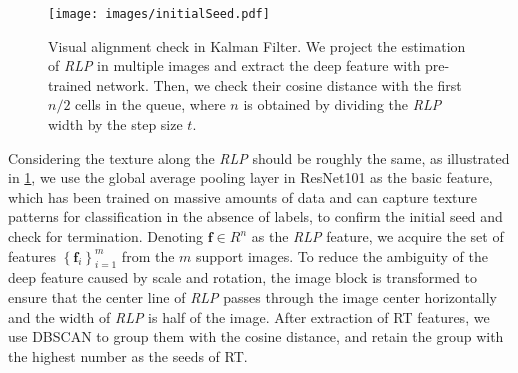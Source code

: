 \begin{figure}[h]
    \centering
    \texttt{[image: images/initialSeed.pdf]}
    \caption{Visual alignment check in Kalman Filter.
    We project the estimation of \textit{RLP} in multiple images and extract the deep feature with pre-trained network.
    Then, 
    we check their cosine distance with the first $n/2$ cells in the queue,
    where $n$ is obtained by dividing the \textit{RLP} width by the step size $t$.}
    \label{fig_visualCheck}
\end{figure}

Considering the texture along the \textit{RLP} should be roughly the same, 
as illustrated in \cref{fig_visualCheck},
we use the global average pooling layer in ResNet101 as the basic feature,
which has been trained on massive amounts of data and can capture texture patterns for classification in the absence of labels,
to confirm the initial seed and check for termination.
Denoting $\mathbf f \in R^n$ as the \textit{RLP} feature,
we acquire the set of features $\left\{\mathbf f_i\right\}_{i=1}^m$ from the $m$ support images.
To reduce the ambiguity of the deep feature caused by scale and rotation,
the image block is transformed to ensure that the center line of \textit{RLP} passes through the image center horizontally and the width of \textit{RLP} is half of the image.
After extraction of RT features, 
we use DBSCAN to group them with the cosine distance,
and retain the group with the highest number as the seeds of RT.



